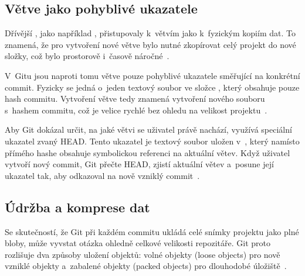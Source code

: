 \subsection*{Větve jako pohyblivé ukazatele}
\label{subsec:git:vetve_pohyblive_ukazatele}
Dřívější \VCS{}, jako například \SVN{}, přistupovaly k~větvím jako k~fyzickým kopiím dat. To znamená, že pro vytvoření nové větve bylo nutné zkopírovat celý projekt do nové složky, což bylo prostorově i~časově náročné~\cite{chacon2014progit}.

V~Gitu jsou naproti tomu větve pouze pohyblivé ukazatele směřující na konkrétní commit. Fyzicky se jedná o~jeden textový soubor ve složce , který obsahuje pouze hash commitu. Vytvoření větve tedy znamená vytvoření nového souboru s~hashem commitu, což je velice rychlé bez ohledu na velikost projektu~\cite{chacon2014progit}.

Aby Git dokázal určit, na jaké větvi se uživatel právě nachází, využívá speciální ukazatel zvaný HEAD. Tento ukazatel je textový soubor uložen v~, který namísto přímého hashe obsahuje symbolickou referenci na aktuální větev. Když uživatel vytvoří nový commit, Git přečte HEAD, zjistí aktuální větev a~posune její ukazatel tak, aby odkazoval na nově vzniklý commit~\cite{chacon2014progit}.


\subsection*{Údržba a komprese dat} %
\label{subsec:git:udrzba_komprese_dat}
Se skutečností, že Git při každém commitu ukládá celé snímky projektu jako plné bloby, může vyvstat otázka ohledně celkové velikosti repozitáře. Git proto rozlišuje dva způsoby uložení objektů: volné objekty (loose objects) pro nově vzniklé objekty a~zabalené objekty (packed objects) pro dlouhodobé úložiště~\cite{chacon2014progit}.

